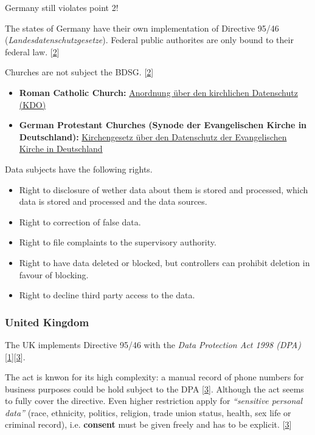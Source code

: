 Germany still violates point 2!

The states of Germany have their own implementation of Directive 95/46 (\emph{Landesdatenschutzgesetze}).
Federal public authorites are only bound to their federal law. {[}\hyperref[references]{2}{]}

Churches are not subject the BDSG. {[}\hyperref[references]{2}{]}

\begin{itemize}

\item
\textbf{Roman Catholic Church:}
\href{http://de.wikipedia.org/wiki/Anordnung_\%C3\%BCber_den_kirchlichen_Datenschutz}{Anordnung  über den kirchlichen Datenschutz (KDO)}

\item
\textbf{German Protestant Churches (Synode der Evangelischen Kirche in Deutschland):}
\href{http://de.wikipedia.org/wiki/Datenschutzgesetz_der_Evangelischen_Kirche_in_Deutschland}{Kirchengesetz  über den Datenschutz der Evangelischen Kirche in Deutschland}
\end{itemize}

Data subjects have the following rights.

\begin{itemize}
\item
Right to disclosure of wether data about them is stored and processed, which data is stored and processed and the data sources.
\item
Right to correction of false data.

\item
Right to file complaints to the supervisory authority.

\item
Right to have data deleted or blocked, but controllers can prohibit deletion in favour of blocking.

\item
Right to decline third party access to the data.
\end{itemize}

\subsubsection*{United Kingdom}

The UK implements Directive 95/46 with the \emph{Data Protection Act 1998 (DPA)} {[}\hyperref[references]{1}{]}{[}\hyperref[references]{3}{]}.

The act is knwon for its high complexity: a manual record of phone numbers for business purposes could be hold subject to the DPA {[}\hyperref[references]{3}{]}.
Although the act seems to fully cover the directive.
Even higher restriction apply for \emph{``sensitive personal data''} (race, ethnicity, politics, religion, trade union status, health, sex life or criminal record), i.e. \textbf{consent} must be given freely and has to be explicit. {[}\hyperref[references]{3}{]}


